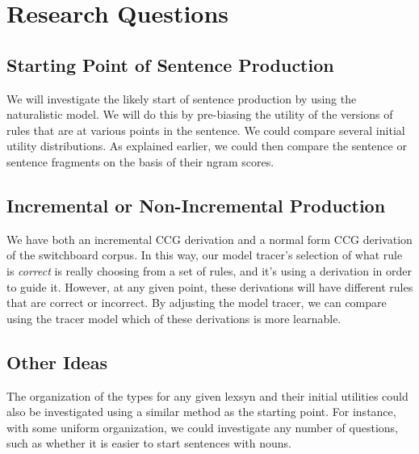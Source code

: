 \section{Research Questions}
\subsection{Starting Point of Sentence Production}
We will investigate the likely start of sentence production by using the naturalistic model. We will do this by pre-biasing the utility of the versions of rules that are at various points in the sentence. We could compare several initial utility distributions. As explained earlier, we could then compare the sentence or sentence fragments on the basis of their ngram scores.

\subsection{Incremental or Non-Incremental Production}
We have both an incremental CCG derivation and a normal form CCG derivation of the switchboard corpus. In this way, our model tracer's selection of what rule is \textit{correct} is really choosing from a set of rules, and it's using a derivation in order to guide it. However, at any given point, these derivations will have different rules that are correct or incorrect. By adjusting the model tracer, we can compare using the tracer model which of these derivations is more learnable.  

\subsection{Other Ideas}
The organization of the types for any given lexsyn and their initial utilities could also be investigated using a similar method as the starting point. For instance, with some uniform organization, we could investigate any number of questions, such as whether it is easier to start sentences with nouns.